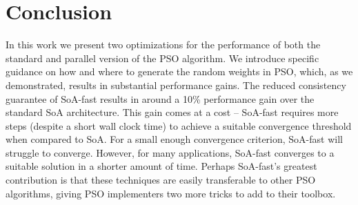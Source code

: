 \section{Conclusion}
In this work we present two optimizations for the performance of both the
standard and parallel version of the PSO algorithm. We introduce
specific guidance on how and where to generate the random weights in
PSO, which, as we demonstrated, results in substantial performance gains. 
The reduced consistency guarantee of SoA-fast results in around a 10\% performance
gain over the standard SoA architecture. This gain comes at a cost -- SoA-fast
requires more steps (despite a short wall clock time) to achieve a suitable
convergence threshold when compared to SoA. For a small enough convergence
criterion, SoA-fast will struggle to converge. However, for many applications,
SoA-fast converges to a suitable solution in a shorter amount of time. Perhaps
SoA-fast's greatest contribution is that these techniques are easily transferable
to other PSO algorithms, giving PSO implementers two more tricks to add to their
toolbox.



